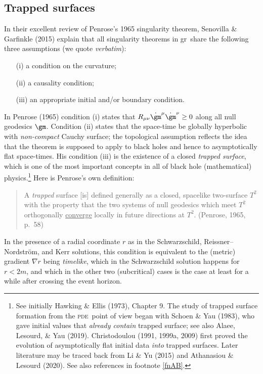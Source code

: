 \documentclass[12pt]{article}
\newcommand{\pde}{\textsc{pde}}
\newcommand{\GR}{{\sc gr}}
\begin{document}
\subsection{Trapped surfaces}
In their excellent review of Penrose's 1965 singularity theorem, Senovilla \& Garfinkle (2015) explain that all singularity theorems in \GR\ share the following three assumptions (we quote \emph{verbatim}):
\begin{enumerate}
\item[(i)] a condition on the curvature;
 \item[(ii)] a causality condition;
 \item[(iii)] an appropriate initial and/or boundary condition.
\end{enumerate}
In Penrose (1965) condition (i) states that $R_{\mu\nu}\dot{\gm}^{\mu}\dot{\gm}^{\nu}\geq 0$ along all null geodesics $\gm$.
Condition (ii) states that the space-time be globally hyperbolic with \emph{non-compact} Cauchy surface; the topological assumption reflects the idea  that the theorem is supposed to apply to black holes and hence to asymptotically flat space-times. His condition (iii) is the existence of a closed \emph{trapped surface}, which is one of the most important concepts in all of black hole (mathematical) physics.\footnote{See initially Hawking \& Ellis (1973), Chapter 9. The  study of trapped surface formation from the \pde\ point of view  began with
 Schoen \& Yau (1983), who gave initial values that \emph{already contain} trapped surface; see also Alaee, Lesourd, \& Yau (2019). 
Christodoulou (1991, 1999a, 2009) first proved the evolution of asymptotically flat initial data \emph{into} trapped surfaces.  
Later literature may be traced back from  Li \& Yu (2015) and  Athanasiou \& Lesourd (2020). 
See also  references in footnote \ref{fnAB}.}  Here is Penrose's  own definition:
 \begin{quote}
\begin{small}
A \emph{trapped} surface [is] defined generally as a closed, spacelike two-surface $T^2$ with the property that the two systems of null geodesics which meet $T^2$ orthogonally \ul{converge} locally in future directions at $T^2$.
(Penrose, 1965, p.\ 58)
\end{small}
\end{quote}
In the presence of a radial coordinate $r$  as in the Schwarzschild, Reissner--Nordstr\"{o}m, and Kerr solutions, this  condition is equivalent to the (metric) gradient $\nabla r$ being \emph{timelike}, which in the Schwarzschild solution
happens for $r<2m$, and which in the other two (subcritical) cases is the case at least for a while after crossing the  event horizon.
\end{document}
